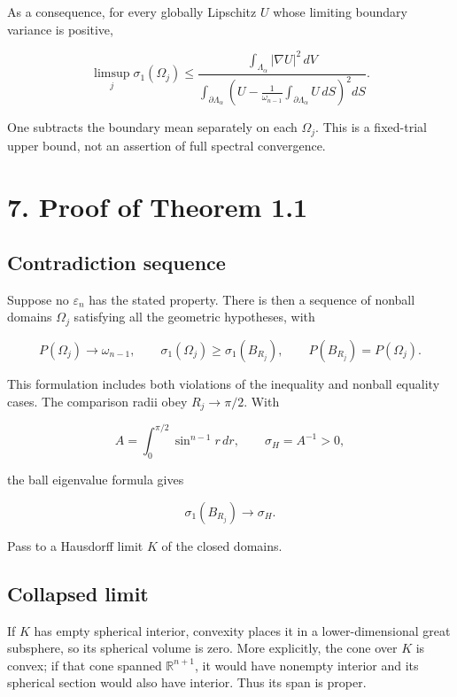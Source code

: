 \documentclass[11pt]{article}
\begin{document}
As a consequence, for every globally Lipschitz \(U\) whose limiting
boundary variance is positive,

\[
\limsup_j\sigma_1(\Omega_j)
\leq
\frac{\int_{\Lambda_\alpha}|\nabla U|^2\,dV}
{\displaystyle\int_{\partial\Lambda_\alpha}
\left(U-\frac1{\omega_{n-1}}\int_{\partial\Lambda_\alpha}U\,dS\right)^2dS}.
\tag{6.13}
\]

One subtracts the boundary mean separately on each \(\Omega_j\). This is
a fixed-trial upper bound, not an assertion of full spectral
convergence.

\section{7. Proof of Theorem 1.1}\label{proof-of-theorem-1.1}

\subsection{Contradiction sequence}\label{contradiction-sequence}

Suppose no \(\varepsilon_n\) has the stated property. There is then a
sequence of nonball domains \(\Omega_j\) satisfying all the geometric
hypotheses, with

\[
P(\Omega_j)\longrightarrow\omega_{n-1},
\qquad
\sigma_1(\Omega_j)\geq\sigma_1(B_{R_j}),
\qquad
P(B_{R_j})=P(\Omega_j).
\tag{7.1}
\]

This formulation includes both violations of the inequality and nonball
equality cases. The comparison radii obey \(R_j\to\pi/2\). With

\[
A=\int_0^{\pi/2}\sin^{n-1}r\,dr,\qquad
\sigma_H=A^{-1}>0,
\tag{7.2}
\]

the ball eigenvalue formula gives

\[
\sigma_1(B_{R_j})\longrightarrow\sigma_H.
\tag{7.3}
\]

Pass to a Hausdorff limit \(K\) of the closed domains.

\subsection{Collapsed limit}\label{collapsed-limit}

If \(K\) has empty spherical interior, convexity places it in a
lower-dimensional great subsphere, so its spherical volume is zero. More
explicitly, the cone over \(K\) is convex; if that cone spanned
\(\mathbb R^{n+1}\), it would have nonempty interior and its spherical
section would also have interior. Thus its span is proper.
\end{document}
